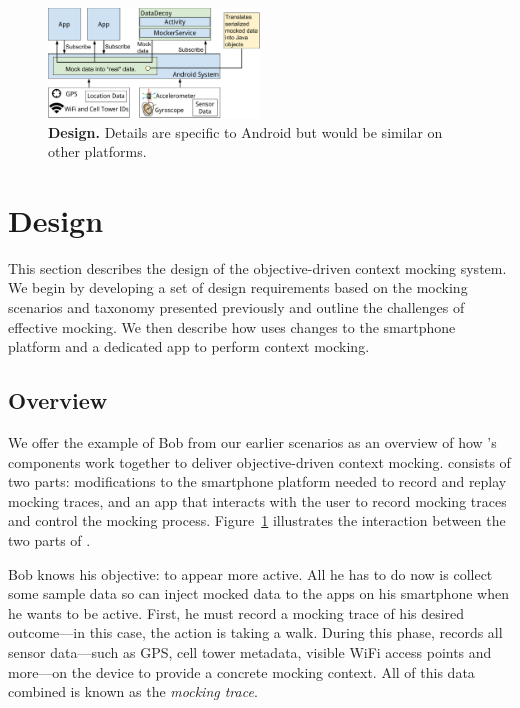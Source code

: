 \begin{figure}[t]
\centering
\includegraphics[width=0.5\textwidth]{./figures/architecture.pdf}

\caption{\textbf{\PocketMocker{} Design.} Details are specific to Android but
would be similar on other platforms.}

\label{fig-design}
\vspace*{-0.1in}
\end{figure}

\section{\PocketMocker{} Design}
\label{sec-design}

This section describes the design of the \PocketMocker{} objective-driven
context mocking system. We begin by developing a set of design requirements
based on the mocking scenarios and taxonomy presented previously and outline
the challenges of effective mocking. We then describe how \PocketMocker{}
uses changes to the smartphone platform and a dedicated app to perform
context mocking.

\subsection{Overview}

We offer the example of Bob from our earlier scenarios as an overview
of how \PocketMocker{}'s components work together to deliver objective-driven
context mocking. \PocketMocker{} consists of two parts:  modifications to the
smartphone platform needed to record and replay mocking traces, and an app
that interacts with the user to record mocking traces and control the mocking
process. Figure~\ref{fig-design} illustrates the interaction between the two
parts of \PocketMocker{}.

Bob knows his objective: to appear more active. All he has to do now is collect
some sample data so \PocketMocker{} can inject mocked data to the apps on his
smartphone when he wants to be active. First, he must record a mocking trace of
his desired outcome---in this case, the action is taking a walk. During this
phase, \PocketMocker{} records all sensor data---such as GPS, cell tower
metadata, visible WiFi access points and more---on the device to provide a
concrete mocking context. All of this data combined is known as the \textit{mocking trace}.

